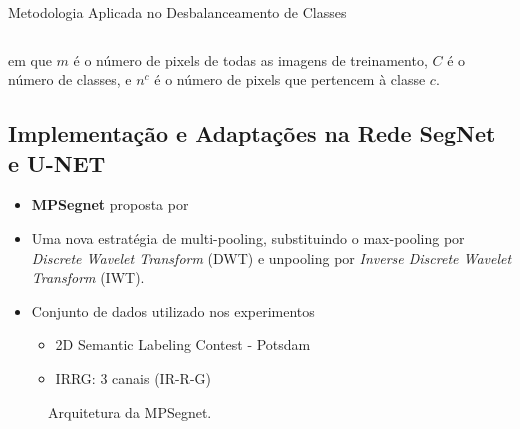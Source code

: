 \documentclass[%
  10pt,%
  aspectratio = 169,%
  compress,%
  t,%
  english,%
  brazilian,%
  tikz,
]{beamer}
\begin{document}
\begin{frame}{Metodologia Aplicada no Desbalanceamento de Classes}
\begin{columns}[T]
\end{columns}

\noindent
em que $m$ é o número de pixels de todas as imagens de treinamento, $C$ é o número de classes, e $n^c$ é o número de pixels que pertencem à classe $c$.

\end{frame}

\subsection{Implementação e Adaptações na Rede SegNet e U-NET}\label{ssec:matmet6}

\begin{frame}

\begin{itemize}
    \item \textbf{MPSegnet} proposta por \textbf{\textcite{Andre2021}}
    \item Uma nova estratégia de multi-pooling, substituindo o max-pooling por \textit{Discrete Wavelet Transform} (DWT) e unpooling por \textit{Inverse Discrete Wavelet Transform} (IWT).
    \item Conjunto de dados utilizado nos experimentos
    \begin{itemize}
        \item 2D Semantic Labeling Contest - Potsdam 
        \item IRRG: 3 canais (IR-R-G)
    \end{itemize}
\end{itemize}

\begin{figure}[!htb]
\centering%
\caption{Arquitetura da MPSegnet.}%
\label{fig:graficoxy1}
\end{figure}

\end{frame}
\end{document}

